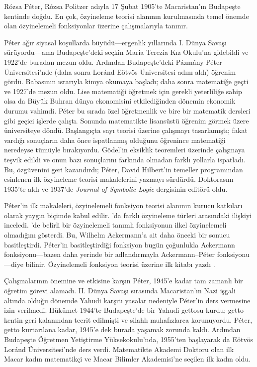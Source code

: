\documentclass[../../../include/open-logic-section]{subfiles}
\begin{document}


 
R\'ozsa P\'eter, R\'ozsa Politzer adıyla 17 Şubat 1905'te Macaristan'ın
Budapeşte kentinde doğdu. En çok, özyineleme teorisi alanının kurulmasında
temel önemde olan özyinelemeli fonksiyonlar üzerine çalışmalarıyla tanınır.

P\'eter ağır siyasal koşullarda büyüdü---ergenlik yıllarında I. Dünya Savaşı
sürüyordu---ama Budapeşte'deki seçkin Maria Terezia Kız Okulu'na gidebildi ve
1922'de buradan mezun oldu. Ardından Budapeşte'deki P\'azm\'any P\'eter
Üniversitesi'nde (daha sonra Lor\'and E\"otv\"os Üniversitesi adını aldı)
öğrenim gördü. Babasının ısrarıyla kimya okumaya başladı; daha sonra
matematiğe geçti ve 1927'de mezun oldu. Lise matematiği öğretmek için gerekli
yeterliliğe sahip olsa da Büyük Buhran dünya ekonomisini etkilediğinden
dönemin ekonomik durumu vahimdi. P\'eter bu sırada özel öğretmenlik ve bire
bir matematik dersleri gibi geçici işlerde çalıştı. Sonunda matematikte
lisansüstü öğrenim görmek üzere üniversiteye döndü. Başlangıçta sayı teorisi
üzerine çalışmayı tasarlamıştı; fakat vardığı sonuçların daha önce ispatlanmış
olduğunu öğrenince matematiği neredeyse tümüyle bırakıyordu. G\"odel'in
eksiklik teoremleri üzerinde çalışmaya teşvik edildi ve onun bazı sonuçlarını
farkında olmadan farklı yollarla ispatladı. Bu, özgüvenini geri kazandırdı;
P\'eter, David Hilbert'in temeller programından esinlenen ilk özyineleme
teorisi makalelerini yazmayı sürdürdü. Doktorasını 1935'te aldı ve 1937'de
\emph{Journal of Symbolic Logic} dergisinin editörü oldu.

P\'eter'in ilk makaleleri, özyinelemeli fonksiyon teorisi alanının kurucu
katkıları olarak yaygın biçimde kabul edilir. \cite{Peter1935a}'da farklı
özyineleme türleri arasındaki ilişkiyi inceledi. \cite{Peter1935b}'de belirli
bir özyinelemeli tanımlı fonksiyonun ilkel özyinelemeli olmadığını gösterdi.
Bu, Wilhelm Ackermann'a ait daha önceki bir sonucu basitleştirdi. P\'eter'in
basitleştirdiği fonksiyon bugün çoğunlukla Ackermann fonksiyonu---bazen daha
yerinde bir adlandırmayla Ackermann--P\'eter fonksiyonu---diye bilinir.
Özyinelemeli fonksiyon teorisi üzerine ilk kitabı yazdı \citep{Peter1951}.

Çalışmalarının önemine ve etkisine karşın P\'eter, 1945'e kadar tam zamanlı
bir öğretim görevi alamadı. II. Dünya Savaşı sırasında Macaristan'ın Nazi
işgali altında olduğu dönemde Yahudi karşıtı yasalar nedeniyle P\'eter'in
ders vermesine izin verilmedi. Hükûmet 1944'te Budapeşte'de bir Yahudi gettosu
kurdu; getto
kentin geri kalanından tecrit edilmişti ve silahlı muhafızlarca korunuyordu.
P\'eter, getto kurtarılana kadar, 1945'e dek burada yaşamak zorunda kaldı.
Ardından Budapeşte Öğretmen Yetiştirme Yüksekokulu'nda, 1955'ten başlayarak da
E\"otv\"os Lor\'and Üniversitesi'nde ders verdi. Matematikte Akademi Doktoru
olan ilk Macar kadın matematikçi ve Macar Bilimler Akademisi'ne seçilen ilk
kadın oldu.
\end{document}
